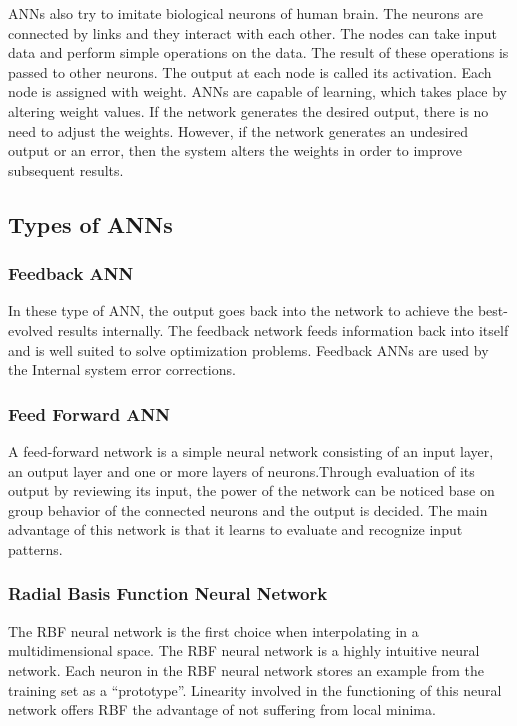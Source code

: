 ANNs also try to imitate biological neurons of human brain. The neurons are connected by links and they interact with each other. The nodes can take input data and perform simple operations on the data. The result of these operations is passed to other neurons. The output at each node is called its activation. Each node is assigned with weight. ANNs are capable of learning, which takes place by altering weight values. If the network generates the desired output, there is no need to adjust the weights. However, if the network generates an undesired output or an error, then the system alters the weights in order to improve subsequent results.

\subsection{Types of ANNs}

\subsubsection{Feedback ANN}

In these type of ANN, the output goes back into the network to achieve the best-evolved results internally. The feedback network feeds information back into itself and is well suited to solve optimization problems. Feedback ANNs are used by the Internal system error corrections. 

\subsubsection{Feed Forward ANN}

A feed-forward network is a simple neural network consisting of an input layer, an output layer and one or more layers of neurons.Through evaluation of its output by reviewing its input, the power of the network can be noticed base on group behavior of the connected neurons and the output is decided. The main advantage of this network is that it learns to evaluate and recognize input patterns.

\subsubsection{Radial Basis Function Neural Network}

The RBF neural network is the first choice when interpolating in a multidimensional space. The RBF neural network is a highly intuitive neural network. Each neuron in the RBF neural network stores an example from the training set as a “prototype”. Linearity involved in the functioning of this neural network offers RBF the advantage of not suffering from local minima.

